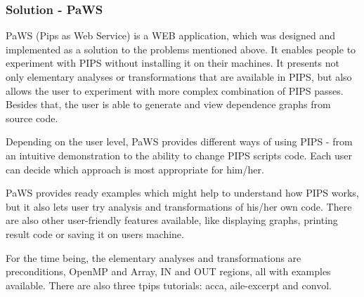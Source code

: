\subsubsection{Solution - PaWS}

PaWS (Pips as Web Service) is a WEB application, which was designed
and implemented as a solution to the problems mentioned above. It
enables people to experiment with PIPS without installing it on their
machines. It presents not only elementary analyses or transformations
that are available in PIPS, but also allows the user to experiment
with more complex combination of PIPS passes. Besides that, the user is
able to generate and view dependence graphs from source code.

Depending on the user level, PaWS provides different ways of using
PIPS - from an intuitive demonstration to the ability to change PIPS
scripts code. Each user can decide which approach is most appropriate for
him/her.

PaWS provides ready examples which might help to understand how
PIPS works, but it also lets user try analysis and transformations of
his/her own code. There are also other user-friendly features
available, like displaying graphs, printing result code or saving it
on users machine.

For the time being, the elementary analyses and transformations are
preconditions, OpenMP and Array, IN and OUT regions, all with examples
available. There are also three tpips tutorials: acca, aile-excerpt
and convol.
